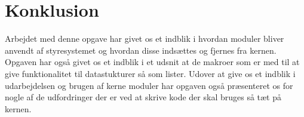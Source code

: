 \documentclass[main.tex]{subfile}
\begin{document}
\section{Konklusion}
Arbejdet med denne opgave har givet os et indblik i hvordan moduler bliver anvendt af styresystemet og hvordan disse indsættes og fjernes fra kernen. Opgaven har også givet os et indblik i et udsnit at de makroer som er med til at give funktionalitet til datastukturer så som lister. Udover at give os et indblik i udarbejdelsen og brugen af kerne moduler har opgaven også præsenteret os for nogle af de udfordringer der er ved at skrive kode der skal bruges så tæt på kernen.\\
\end{document}
